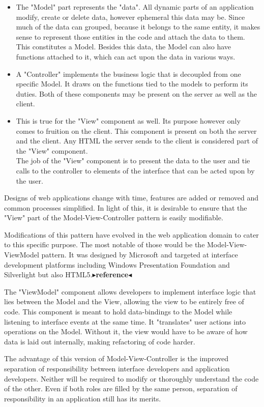 \documentclass[twoside,11pt,openright]{report}
\newcommand{\todo}[1]{{\color[rgb]{.5,0,0}\textbf{$\blacktriangleright$#1$\blacktriangleleft$}}}
\begin{document}
\begin{itemize}
	\item The "Model" part represents the "data". All dynamic parts of an
	application modify, create or delete data, however ephemeral this data may
	be. Since much of the data can grouped, because it belongs to the same
	entity, it makes sense to represent those entities in the code and
	attach the data to them. This constitutes a Model. Besides this data,
	the Model can also have functions attached to it, which can act upon the data
	in various ways.
	\item A "Controller" implements the business logic that is decoupled from one
	specific Model. It draws on the functions tied to the models to perform its
	duties. Both of these components may be present on the server as well
	as the client.
	\item This is true for the "View" component as well. Its purpose however only
	comes to fruition on the client. This component is present on both the server
	and the client. Any HTML the server sends to the client is considered part of
	the "View" component.\\
	The job of the "View" component is to present the data to the user and
	tie calls to the controller to elements of the interface that can be acted
	upon by the user.
\end{itemize}

Designs of web applications change with time, features are added or
removed and common processes simplified. In light of this, it is
desirable to ensure that the "View" part of the Model-View-Controller
pattern is easily modifiable.

Modifications of this pattern have evolved in the web application domain to
cater to this specific purpose. The most notable of those would be the
Model-View-ViewModel pattern. It was designed by Microsoft and targeted at
interface development platforms including Windows Presentation Foundation and
Silverlight but also HTML5.\todo{reference}

The "ViewModel" component allows developers to implement interface logic that
lies between the Model and the View, allowing the view to be entirely free
of code. This component is meant to hold data-bindings to the Model while
listening to interface events at the same time. It "translates" user actions
into operations on the Model. Without it, the view would have to be aware of how
data is laid out internally, making refactoring of code harder.

The advantage of this version of Model-View-Controller is the improved
separation of responsibility between interface developers and application
developers. Neither will be required to modify or thoroughly understand the code
of the other. Even if both roles are filled by the same person,
separation of responsibility in an application still has its merits.
\end{document}
